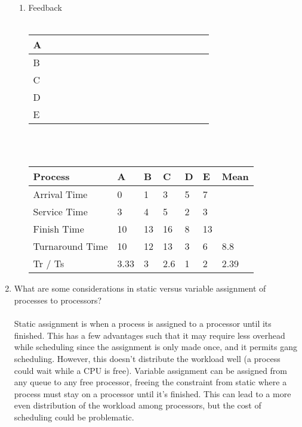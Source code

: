 \documentclass[12pt]{article}
\begin{document}
\begin{enumerate}
\begin{enumerate}
	\item Feedback \\ \\
\begin{tabular}{|l|l|l|l|l|l|l|l|l|l|l|l|l|l|l|l|l|l|}
\hline
A & \cellcolor[HTML]{32CB00} &  & \cellcolor[HTML]{32CB00} &  &  &  &  &  &  &  & \cellcolor[HTML]{32CB00} &  &  &  &  &  &  \\ \hline
B &  & \cellcolor[HTML]{32CB00} &  &  & \cellcolor[HTML]{32CB00} &  &  &  &  &  &  & \cellcolor[HTML]{32CB00} &  &  & \cellcolor[HTML]{32CB00} &  &  \\ \hline
C &  &  &  & \cellcolor[HTML]{32CB00} &  &  & \cellcolor[HTML]{32CB00} &  &  &  &  &  & \cellcolor[HTML]{32CB00} &  &  & \cellcolor[HTML]{32CB00} & \cellcolor[HTML]{32CB00} \\ \hline
D &  &  &  &  &  & \cellcolor[HTML]{32CB00} &  &  & \cellcolor[HTML]{32CB00} &  &  &  &  &  &  &  &  \\ \hline
E &  &  &  &  &  &  &  & \cellcolor[HTML]{32CB00} &  & \cellcolor[HTML]{32CB00} &  &  &  & \cellcolor[HTML]{32CB00} &  &  &  \\ \hline
\end{tabular}
\\ \\

\begin{tabular}{|l|l|l|l|l|l|l|}
\hline
Process & A & B & C & D & E & Mean \\ \hline
Arrival Time & 0 & 1 & 3 & 5 & 7 &  \\ \hline
Service Time & 3 & 4 & 5 & 2 & 3 &  \\ \hline
Finish Time & 10 & 13 & 16 & 8 & 13 &  \\ \hline
Turnaround Time & 10 & 12 & 13 & 3 & 6 & 8.8 \\ \hline
Tr / Ts & 3.33 & 3 & 2.6 & 1 & 2 & 2.39 \\ \hline
\end{tabular}
   	\end{enumerate}
   	
   	\pagebreak
   	\item What are some considerations in static versus variable assignment of processes to processors? \\ \\
   	Static assignment is when a process is assigned to a processor until its finished. This has a few advantages such that it may require less overhead while scheduling since the assignment is only made once, and it permits gang scheduling. However, this doesn't distribute the workload well (a process could wait while a CPU is free). Variable assignment can be assigned from any queue to any free processor, freeing the constraint from static where a process must stay on a processor until it's finished. This can lead to a more even distribution of the workload among processors, but the cost of scheduling could be problematic. \\
   	

\end{enumerate}
\end{document}
